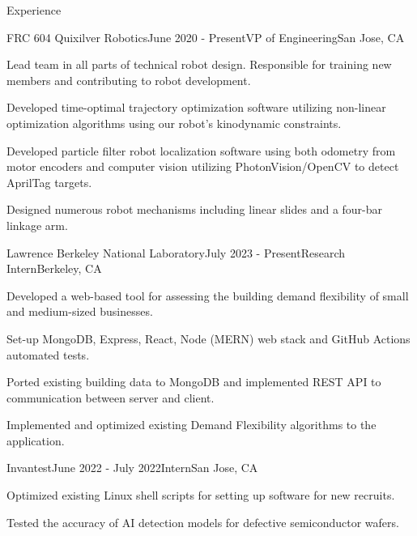 \documentclass[
	11pt, %
]{tex/resume} %
\begin{document}
\begin{rSection}{Experience}

	\begin{rSubsection}{FRC 604 Quixilver Robotics}{June 2020 - Present}{VP of Engineering}{San Jose, CA}
		\item Lead team in all parts of technical robot design. Responsible for training new members and contributing to robot development.
        \item Developed time-optimal trajectory optimization software utilizing non-linear optimization algorithms using our robot’s kinodynamic constraints.
        \item Developed particle filter robot localization software using both odometry from motor encoders and computer vision utilizing PhotonVision/OpenCV to detect AprilTag targets.
        \item Designed numerous robot mechanisms including linear slides and a four-bar linkage arm.
        
	\end{rSubsection}


	\begin{rSubsection}{Lawrence Berkeley National Laboratory}{July 2023 - Present}{Research Intern}{Berkeley, CA}
		\item Developed a web-based tool for assessing the building demand flexibility of small and medium-sized businesses.
		\item Set-up MongoDB, Express, React, Node (MERN) web stack and GitHub Actions automated tests.
        \item Ported existing building data to MongoDB and implemented REST API to communication between server and client.
        \item Implemented and optimized existing Demand Flexibility algorithms to the application.
        
	\end{rSubsection}


	\begin{rSubsection}{Invantest}{June 2022 - July 2022}{Intern}{San Jose, CA}
		\item Optimized existing Linux shell scripts for setting up software for new recruits.
		\item Tested the accuracy of AI detection models for defective semiconductor wafers.
	\end{rSubsection}


\end{rSection}
\end{document}
